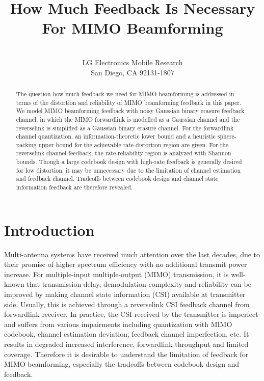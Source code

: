 \documentclass[10pt,fleqn, twocolumn]{IEEEtran}
\title{How Much Feedback Is Necessary For MIMO Beamforming}
\author{\\LG Electronics Mobile Research\\San Diego, CA 92131-1807}
\date{}
\begin{document}
\maketitle
\begin{abstract}\small
The question how much feedback we need for MIMO beamforming is
addressed in terms of the distortion and reliability of MIMO
beamforming feedback in this paper. We model MIMO beamforming
feedback with noisy Gaussian binary erasure feedback channel, in
which the MIMO forwardlink is modelled as a Gaussian channel and
the reverselink is simplified as a Gaussian binary erasure
channel. For the forwardlink channel quantization, an
information-theoretic lower bound and a heuristic sphere-packing
upper bound for the achievable rate-distortion region are given.
For the reverselink channel feedback, the rate-reliability region
is analyzed with Shannon bounds. Though a large codebook design
with high-rate feedback is generally desired for low distortion,
it may be unnecessary due to the limitation of channel estimation
and feedback channel. Tradeoffs between codebook design and
channel state information feedback are therefore revealed.
\end{abstract}

\section{Introduction}
Multi-antenna systems have received much attention over the last
decades, due to their promise of higher spectrum efficiency with
no additional transmit power increase. For multiple-input
multiple-output (MIMO) transmission, it is well-known that
transmission delay, demodulation complexity and reliability can be
improved by making channel state information (CSI) available at
transmitter side. Usually, this is achieved through a reverselink
CSI feedback channel from forwardlink receiver. In practice, the
CSI received by the transmitter is imperfect and suffers from
various impairments including quantization with MIMO codebook,
channel estimation deviation, feedback channel imperfection, etc.
It results in degraded increased interference, forwardlink
throughput and limited coverage. Therefore it is desirable to
understand the limitation of feedback for MIMO beamforming,
especially the tradeoffs between codebook design and feedback.
\end{document}
